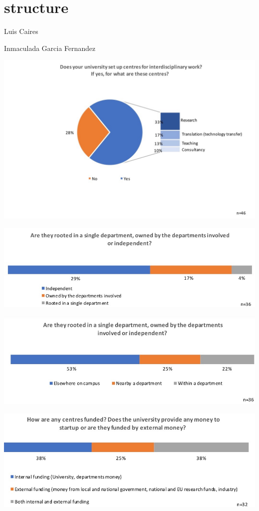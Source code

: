 \section{structure}

Luis Caires

Inmaculada Garcia Fernandez

\includegraphics[width = \linewidth]{charts/5a.jpg}

\includegraphics[width = \linewidth]{charts/5c.jpg}

\includegraphics[width = \linewidth]{charts/5d.jpg}

\includegraphics[width = \linewidth]{charts/5e.jpg}

